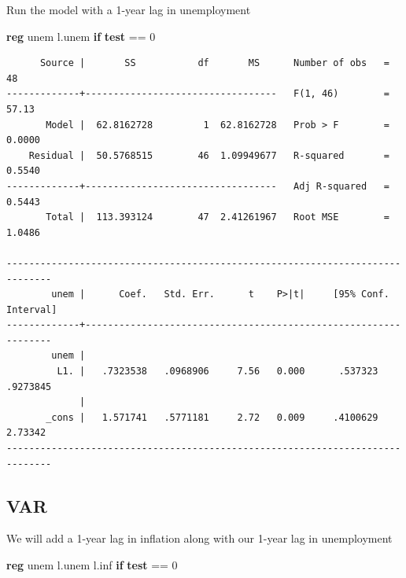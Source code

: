 \documentclass[
]{book}
\newenvironment{Shaded}{\begin{snugshade}}{\end{snugshade}}
\newcommand{\KeywordTok}[1]{\textcolor[rgb]{0.13,0.29,0.53}{\textbf{#1}}}
\newcommand{\NormalTok}[1]{#1}
\newcommand{\OtherTok}[1]{\textcolor[rgb]{0.56,0.35,0.01}{#1}}
\begin{document}
Run the model with a 1-year lag in unemployment

\begin{Shaded}
\begin{Highlighting}[]
\KeywordTok{reg}\NormalTok{ unem }\OtherTok{l}\NormalTok{.unem }\KeywordTok{if} \KeywordTok{test}\NormalTok{ == 0}
\end{Highlighting}
\end{Shaded}

\begin{verbatim}
      Source |       SS           df       MS      Number of obs   =        48
-------------+----------------------------------   F(1, 46)        =     57.13
       Model |  62.8162728         1  62.8162728   Prob > F        =    0.0000
    Residual |  50.5768515        46  1.09949677   R-squared       =    0.5540
-------------+----------------------------------   Adj R-squared   =    0.5443
       Total |  113.393124        47  2.41261967   Root MSE        =    1.0486

------------------------------------------------------------------------------
        unem |      Coef.   Std. Err.      t    P>|t|     [95% Conf. Interval]
-------------+----------------------------------------------------------------
        unem |
         L1. |   .7323538   .0968906     7.56   0.000      .537323    .9273845
             |
       _cons |   1.571741   .5771181     2.72   0.009     .4100629     2.73342
------------------------------------------------------------------------------
\end{verbatim}

\subsection*{VAR}\label{var}

We will add a 1-year lag in inflation along with our 1-year lag in unemployment

\begin{Shaded}
\begin{Highlighting}[]
\KeywordTok{reg}\NormalTok{ unem }\OtherTok{l}\NormalTok{.unem }\OtherTok{l}\NormalTok{.inf }\KeywordTok{if} \KeywordTok{test}\NormalTok{ == 0}
\end{Highlighting}
\end{Shaded}
\end{document}

